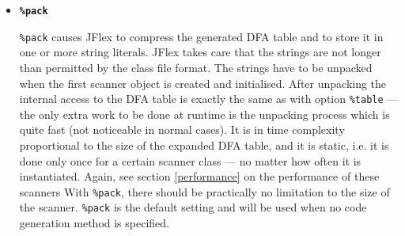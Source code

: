 \documentclass[11pt]{scrartcl}
\begin{document}
\begin{itemize}
\item
  {\bf \texttt{\%pack}}
  
  \texttt{\%pack} causes JFlex to compress the generated DFA table and to
  store it in one or more string literals. JFlex takes care that the
  strings are not longer than permitted by the class file format.
  The strings have to be unpacked when
  the first scanner object is created and initialised.
  After unpacking the internal access to the DFA table is exactly the
  same as with option \texttt{\%table} --- the only extra work to be done
  at runtime is the unpacking process which is quite fast (not noticeable
  in normal cases). It is in time complexity proportional to the
  size of the expanded DFA table, and it is static,
  i.e. it is done only once for a certain scanner class --- no matter
  how often it is instantiated.  Again, see section
  \ref{performance} 
  on the performance of these scanners
  With \texttt{\%pack}, there should be practically no
  limitation to the size of the scanner. \texttt{\%pack} is the default
  setting and will be used when no code generation method is specified.
\end{itemize}
\end{document}
